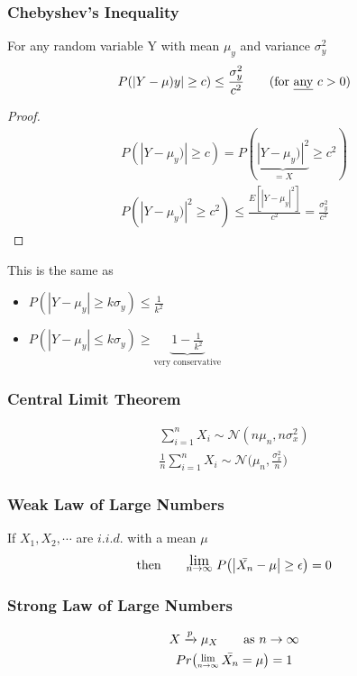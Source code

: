 \subsubsection*{Chebyshev's Inequality}
For any random variable Y with mean $\mu_y$ and variance $\sigma_y^2$
\begin{equation*}
	P(|Y - \mu)y| \geq c) \leq \frac{\sigma_y^2}{c^2} \tag{for \underline{any} $c > 0$}
\end{equation*}
\begin{proof}
	\begin{gather*}
		P(|Y - \mu_y)| \geq c) = P(\underbrace{|Y - \mu_y)|^2}_{=X} \geq c^2)\\
		P(|Y - \mu_y)|^2 \geq c^2) \leq \frac{E[|Y - \mu_y|^2]}{c^2} = \frac{\sigma_y^2}{c^2}
	\end{gather*}
\end{proof}
This is the same as
\begin{itemize}[label={--}]
	\item $P(|Y - \mu_y| \geq k \sigma_y) \leq \frac{1}{k^2}$
	\item $P(|Y - \mu_y| \leq k \sigma_y) \geq \underbrace{1- \frac{1}{k^2}}_{\text{very conservative}}$
\end{itemize}
\subsubsection*{Central Limit Theorem}
\begin{gather*}
	\sum\limits_{i=1}^n X_i \sim \mathcal{N}(n\mu_n, n\sigma_x^2)\\
	\frac{1}{n} \sum\limits_{i=1}^n X_i \sim \mathcal{N}\bigg(\mu_n, \frac{\sigma_x^2}{n}\bigg)
\end{gather*}
\subsubsection*{Weak Law of Large Numbers}
If $X_1, X_2, \cdots$ are $i.i.d.$ with a mean $\mu$
\begin{equation*}
	\text{then} \qquad \mathlarger{\mathlarger{\Lim{n \rightarrow \infty}}} {\large P}\big( \big| \bar{X_n} - \mu \big| \geq \epsilon \big) = 0
\end{equation*}
\subsubsection*{Strong Law of Large Numbers}
\begin{gather*}
	X \xrightarrow{p} \mu_X \qquad \text{as } n \rightarrow \infty\\
	Pr \big(\Lim{n\rightarrow \infty} \bar{X_n} = \mu \big) = 1
\end{gather*}
\redhline\\

